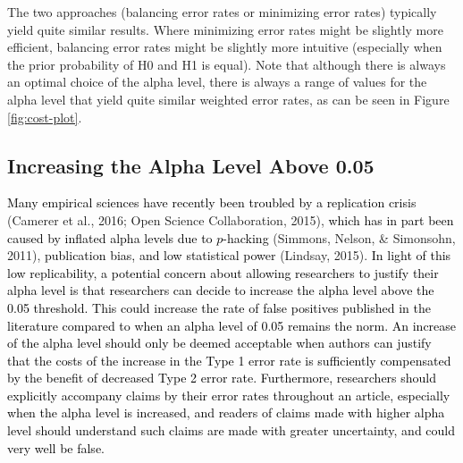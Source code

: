 \documentclass[
  english,
  ,man, a4paper,floatsintext]{apa6}
\begin{document}
The two approaches (balancing error rates or minimizing error rates) typically yield quite similar results. Where minimizing error rates might be slightly more efficient, balancing error rates might be slightly more intuitive (especially when the prior probability of H0 and H1 is equal). Note that although there is always an optimal choice of the alpha level, there is always a range of values for the alpha level that yield quite similar weighted error rates, as can be seen in Figure \ref{fig:cost-plot}.

\hypertarget{increasing-the-alpha-level-above-0.05}{%
\subsection{Increasing the Alpha Level Above 0.05}\label{increasing-the-alpha-level-above-0.05}}

\textcolor{black}{Many empirical sciences have recently been troubled by a replication crisis}
(Camerer et al., 2016; Open Science Collaboration, 2015), \textcolor{black}{which has in part been caused by inflated alpha levels due to $p$-hacking} (Simmons, Nelson, \& Simonsohn, 2011), \textcolor{black}{publication bias, and low statistical power} (Lindsay, 2015). \textcolor{black}{In light of this low replicability, a potential concern about allowing researchers to justify their alpha level is that researchers can decide to increase the alpha level above the 0.05 threshold. This could increase the rate of false positives published in the literature compared to when an alpha level of 0.05 remains the norm. An increase of the alpha level should only be deemed acceptable when authors can justify that the costs of the increase in the Type 1 error rate is sufficiently compensated by the benefit of decreased Type 2 error rate. Furthermore, researchers should explicitly accompany claims by their error rates throughout an article, especially when the alpha level is increased, and readers of claims made with higher alpha level should understand such claims are made with greater uncertainty, and could very well be false.}
\end{document}

